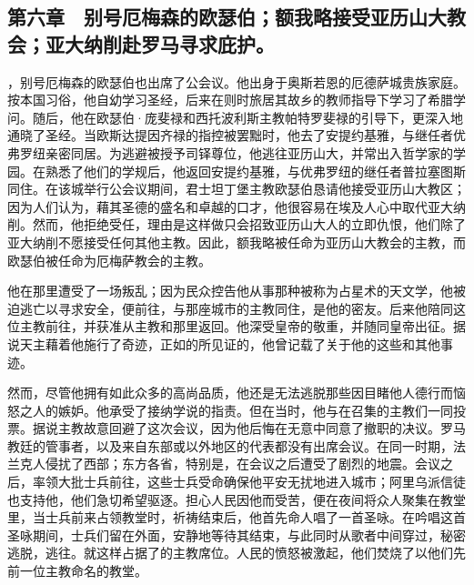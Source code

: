 
\subsection{第六章　别号厄梅森的欧瑟伯；额我略接受亚历山大教会；亚大纳削赴罗马寻求庇护。}

，别号厄梅森的欧瑟伯也出席了公会议。他出身于奥斯若恩的厄德萨城贵族家庭。按本国习俗，他自幼学习圣经，后来在则时旅居其故乡的教师指导下学习了希腊学问。随后，他在欧瑟伯·庞斐禄和西托波利斯主教帕特罗斐禄的引导下，更深入地通晓了圣经。当欧斯达提因齐禄的指控被罢黜时，他去了安提约基雅，与继任者优弗罗纽亲密同居。为逃避被授予司铎尊位，他逃往亚历山大，并常出入哲学家的学园。在熟悉了他们的学规后，他返回安提约基雅，与优弗罗纽的继任者普拉塞图斯同住。在该城举行公会议期间，君士坦丁堡主教欧瑟伯恳请他接受亚历山大教区；因为人们认为，藉其圣德的盛名和卓越的口才，他很容易在埃及人心中取代亚大纳削。然而，他拒绝受任，理由是这样做只会招致亚历山大人的立即仇恨，他们除了亚大纳削不愿接受任何其他主教。因此，额我略被任命为亚历山大教会的主教，而欧瑟伯被任命为厄梅萨教会的主教。\par

他在那里遭受了一场叛乱；因为民众控告他从事那种被称为占星术的天文学，他被迫逃亡以寻求安全，便前往，与那座城市的主教同住，是他的密友。后来他陪同这位主教前往，并获准从主教和那里返回。他深受皇帝的敬重，并随同皇帝出征。据说天主藉着他施行了奇迹，正如的所见证的，他曾记载了关于他的这些和其他事迹。\par

然而，尽管他拥有如此众多的高尚品质，他还是无法逃脱那些因目睹他人德行而恼怒之人的嫉妒。他承受了接纳学说的指责。但在当时，他与在召集的主教们一同投票。据说主教故意回避了这次会议，因为他后悔在无意中同意了撤职的决议。罗马教廷的管事者，以及来自东部或以外地区的代表都没有出席会议。在同一时期，法兰克人侵扰了西部；东方各省，特别是，在会议之后遭受了剧烈的地震。会议之后，率领大批士兵前往，这些士兵受命确保他平安无扰地进入城市；阿里乌派信徒也支持他，他们急切希望驱逐。担心人民因他而受苦，便在夜间将众人聚集在教堂里，当士兵前来占领教堂时，祈祷结束后，他首先命人唱了一首圣咏。在吟唱这首圣咏期间，士兵们留在外面，安静地等待其结束，与此同时从歌者中间穿过，秘密逃脱，逃往。就这样占据了的主教席位。人民的愤怒被激起，他们焚烧了以他们先前一位主教命名的教堂。\par

